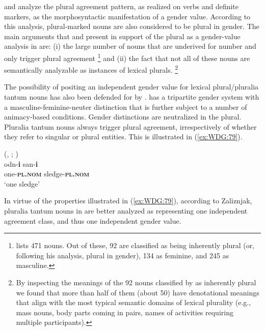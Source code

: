 \documentclass[output=collectionpaper]{langsci/langscibook}
\begin{document}
\cite{Orkaydo2013} and \cite{Tsegaye2017} analyze the plural agreement pattern, as realized on verbs and definite markers, as the morphosyntactic manifestation of a gender value. According to this analysis, plural-marked nouns are also considered to be plural in gender. The main arguments that \cite{Orkaydo2013} and \cite{Tsegaye2017} present in support of the plural as a gender-value analysis in  are: (i) the large number of nouns that are underived for number and only trigger plural agreement%
\footnote{%
\cite[318--330]{Orkaydo2013} lists 471  nouns. Out of these, 92 are classified as being inherently plural (or, following his analysis, plural in gender), 134 as feminine, and 245 as masculine.%
} %
and (ii) the fact that not all of these nouns are semantically analyzable as instances of lexical plurals.%
\footnote{%
By inspecting the meanings of the 92 nouns classified by \cite[318--330]{Orkaydo2013} as inherently plural we found that more than half of them (about 50) have denotational meanings that align with the most typical semantic domains of lexical plurality (e.g., mass nouns, body parts coming in pairs, names of activities requiring multiple participants).
}%

The possibility of positing an independent gender value for lexical plural\slash pluralia tantum nouns has also been defended for  by \cite{Zaliznjak1977}.  has a tripartite gender system with a masculine-feminine-neuter distinction that is further subject to a number of animacy-based conditions. Gender distinctions are neutralized in the plural. Pluralia tantum nouns always trigger plural agreement, irrespectively of whether they refer to singular or plural entities. This is illustrated in (\ref{ex:WDG:79}).

\ea\label{ex:WDG:79}
 (, ; \citealt[237]{Corbett2012}) \\
\gll odn-\textbf{i} 	san-\textbf{i}\\
one-\textbf{\textsc{pl.nom}} 	sledge-\textbf{\textsc{pl.nom}} \\
\glt `one sledge' \\
\z

\noindent In virtue of the properties illustrated in (\ref{ex:WDG:79}), according to Zaliznjak, pluralia tantum nouns in  are better analyzed as representing one independent agreement class, and thus one independent gender value.
\end{document}
